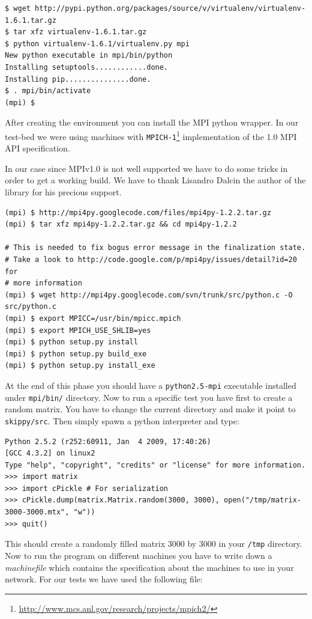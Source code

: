 \begin{verbatim}
$ wget http://pypi.python.org/packages/source/v/virtualenv/virtualenv-1.6.1.tar.gz
$ tar xfz virtualenv-1.6.1.tar.gz
$ python virtualenv-1.6.1/virtualenv.py mpi
New python executable in mpi/bin/python
Installing setuptools............done.
Installing pip...............done.
$ . mpi/bin/activate
(mpi) $
\end{verbatim}

After creating the environment you can install the MPI python wrapper.
In our test-bed we were using machines with
\texttt{MPICH-1}\footnote{\url{http://www.mcs.anl.gov/research/projects/mpich2/}}
implementation of the 1.0 MPI API specification.

In our case since MPIv1.0 is not well supported we have to do some
tricks in order to get a working build. We have to thank Lisandro Dalcin
the author of the library for his precious support.

\begin{verbatim}
(mpi) $ http://mpi4py.googlecode.com/files/mpi4py-1.2.2.tar.gz
(mpi) $ tar xfz mpi4py-1.2.2.tar.gz && cd mpi4py-1.2.2

# This is needed to fix bogus error message in the finalization state.
# Take a look to http://code.google.com/p/mpi4py/issues/detail?id=20 for
# more information
(mpi) $ wget http://mpi4py.googlecode.com/svn/trunk/src/python.c -O src/python.c
(mpi) $ export MPICC=/usr/bin/mpicc.mpich
(mpi) $ export MPICH_USE_SHLIB=yes
(mpi) $ python setup.py install
(mpi) $ python setup.py build_exe
(mpi) $ python setup.py install_exe
\end{verbatim}

At the end of this phase you should have a \texttt{python2.5-mpi}
executable installed under \texttt{mpi/bin/} directory. Now to run a
specific test you have first to create a random matrix. You have to
change the current directory and make it point to
\texttt{skippy/src}. Then simply spawn a python interpreter and type:

\begin{verbatim}
Python 2.5.2 (r252:60911, Jan  4 2009, 17:40:26) 
[GCC 4.3.2] on linux2
Type "help", "copyright", "credits" or "license" for more information.
>>> import matrix
>>> import cPickle # For serialization
>>> cPickle.dump(matrix.Matrix.random(3000, 3000), open("/tmp/matrix-3000-3000.mtx", "w"))
>>> quit()
\end{verbatim}

This should create a randomly filled matrix 3000 by 3000 in your
\texttt{/tmp} directory. Now to run the program on different machines
you have to write down a \emph{machinefile} which contains the
specification about the machines to use in your network. For our tests
we have used the following file:


